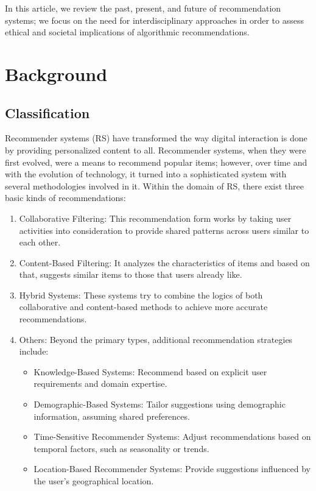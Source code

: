 \documentclass{article}
\begin{document}
In this article, we review the past, present, and future of recommendation systems; we focus on the need for interdisciplinary approaches in order to assess ethical and societal implications of algorithmic recommendations.


\section{Background}
\subsection{Classification}
Recommender systems (RS) have transformed the way digital interaction is done by providing personalized content to all. Recommender systems, when they were first evolved, were a means to recommend popular items; however, over time and with the evolution of technology, it turned into a sophisticated system with several methodologies involved in it. Within the domain of RS, there exist three basic kinds of recommendations: 
\begin{enumerate}
\item Collaborative Filtering: This recommendation form works by taking user activities  into consideration to provide shared patterns across users similar to each other. \cite{RS}
\item Content-Based Filtering: It analyzes the characteristics of items and based on that, suggests similar items to those that users already like. \cite{RS_AA_3}
\item Hybrid Systems: These systems try to combine the logics of both collaborative and content-based methods to achieve more accurate recommendations.\cite{RS}\cite{RS_AA_3}
\item Others: Beyond the primary types, additional recommendation strategies include:
    \begin{itemize}
    \item Knowledge-Based Systems: Recommend based on explicit user requirements and domain expertise.\cite{RS_AA_5}
    \item Demographic-Based Systems: Tailor suggestions using demographic information, assuming shared preferences.\cite{RS}
    \item Time-Sensitive Recommender Systems: Adjust recommendations based on temporal factors, such as seasonality or trends. \cite{RS}
    \item Location-Based Recommender Systems: Provide suggestions influenced by the user's geographical location.\cite{RS}
    \end{itemize}
\end{enumerate}
\end{document}
